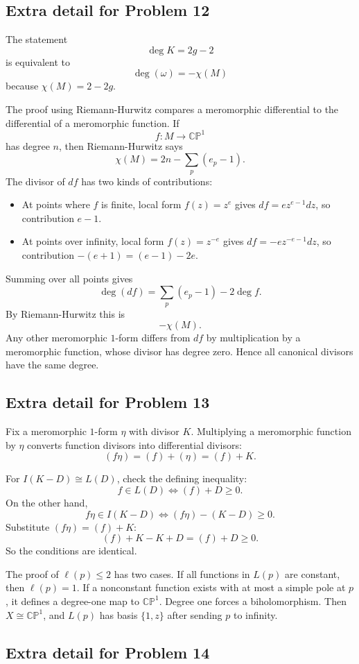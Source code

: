 \documentclass[11pt]{article}
\newcommand{\CP}{\mathbb{CP}}
\begin{document}
\subsection*{Extra detail for Problem 12}

The statement
\[
 \deg K=2g-2
\]
is equivalent to
\[
 \deg(\omega)=-\chi(M)
\]
because $\chi(M)=2-2g$.

The proof using Riemann-Hurwitz compares a meromorphic differential to the differential of a meromorphic function. If
\[
 f:M\to\CP^1
\]
has degree $n$, then Riemann-Hurwitz says
\[
 \chi(M)=2n-\sum_p(e_p-1).
\]
The divisor of $df$ has two kinds of contributions:
\begin{itemize}
\item At points where $f$ is finite, local form $f(z)=z^e$ gives $df=ez^{e-1}dz$, so contribution $e-1$.
\item At points over infinity, local form $f(z)=z^{-e}$ gives $df=-ez^{-e-1}dz$, so contribution $-(e+1)=(e-1)-2e$.
\end{itemize}
Summing over all points gives
\[
 \deg(df)=\sum_p(e_p-1)-2\deg f.
\]
By Riemann-Hurwitz this is
\[
 -\chi(M).
\]
Any other meromorphic $1$-form differs from $df$ by multiplication by a meromorphic function, whose divisor has degree zero. Hence all canonical divisors have the same degree.

\subsection*{Extra detail for Problem 13}

Fix a meromorphic $1$-form $\eta$ with divisor $K$. Multiplying a meromorphic function by $\eta$ converts function divisors into differential divisors:
\[
 (f\eta)=(f)+(\eta)=(f)+K.
\]

For $I(K-D)\cong L(D)$, check the defining inequality:
\[
 f\in L(D)
 \Longleftrightarrow
 (f)+D\geq0.
\]
On the other hand,
\[
 f\eta\in I(K-D)
 \Longleftrightarrow
 (f\eta)-(K-D)\geq0.
\]
Substitute $(f\eta)=(f)+K$:
\[
 (f)+K-K+D=(f)+D\geq0.
\]
So the conditions are identical.

The proof of $\ell(p)\leq2$ has two cases. If all functions in $L(p)$ are constant, then $\ell(p)=1$. If a nonconstant function exists with at most a simple pole at $p$, it defines a degree-one map to $\CP^1$. Degree one forces a biholomorphism. Then $X\cong\CP^1$, and $L(p)$ has basis $\{1,z\}$ after sending $p$ to infinity.

\subsection*{Extra detail for Problem 14}
\end{document}
